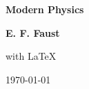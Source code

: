 \documentclass[../../main.tex]{subfiles}
\begin{document}
\begin{titlepage}
    \begin{center}
        \vspace*{0.5cm}
        
        \Huge
        \textbf{Modern Physics}
    
        \vspace{1.5cm}
        \Large
        \textbf{E. F. Faust} 

        \vspace{0.2cm}
        \large with \LaTeX
        
        \vfill
        \begin{figure}[h!]
            \centering
        \end{figure}
        \vfill
        \Large
        {\today}
        
    \end{center}
\end{titlepage}
\end{document}
